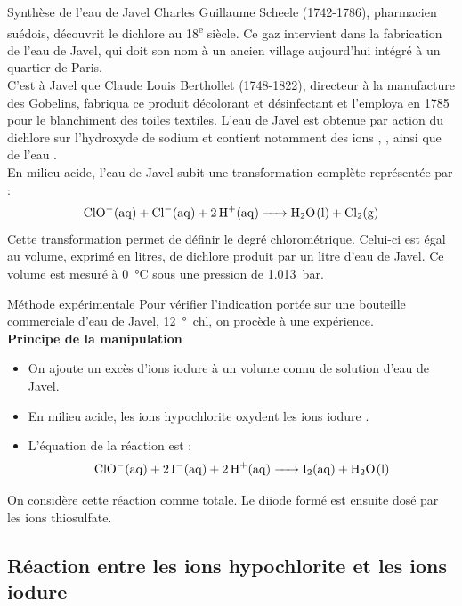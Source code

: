 \documentclass[a4paper,fontsize=11pt,fleqn]{scrartcl}
\begin{document}
\begin{documentboxenv}{Synthèse de l'eau de Javel}
Charles Guillaume Scheele (1742-1786), pharmacien suédois, découvrit le dichlore au 18\textsuperscript{e} siècle. Ce gaz intervient dans la fabrication de l'eau de Javel, qui doit son nom à un ancien village aujourd'hui intégré à un quartier de Paris.\\
C'est à Javel que Claude Louis Berthollet (1748-1822), directeur à la manufacture des Gobelins, fabriqua ce produit décolorant et désinfectant et l'employa en 1785 pour le blanchiment des toiles textiles. L'eau de Javel est obtenue par action du dichlore  sur l'hydroxyde de sodium et contient notamment des ions , ,  ainsi que de l'eau .\\
En milieu acide, l'eau de Javel subit une transformation complète représentée par :
\[
\ce{ClO^-(aq) + Cl^-(aq) + 2H^+(aq) -> H2O(l) + Cl2(g)}
\]
Cette transformation permet de définir le degré chlorométrique. Celui-ci est égal au volume, exprimé en litres, de dichlore produit par un litre d'eau de Javel. Ce volume est mesuré à \SI{0}{\celsius} sous une pression de \SI{1.013}{\bar}.
\end{documentboxenv}

\begin{documentboxenv}{Méthode expérimentale}
Pour vérifier l'indication portée sur une bouteille commerciale d'eau de Javel, \SI{12}{\degree chl}, on procède à une expérience.\\
\textbf{Principe de la manipulation}
\begin{itemize}
    \item On ajoute un excès d'ions iodure à un volume connu de solution d'eau de Javel.
    \item En milieu acide, les ions hypochlorite  oxydent les ions iodure .
    \item L'équation de la réaction est :
    \[
    \ce{ClO^-(aq) + 2I^-(aq) + 2H^+(aq) -> I2(aq) + H2O(l)}
    \]
\end{itemize}
On considère cette réaction comme totale. Le diiode formé est ensuite dosé par les ions thiosulfate.
\end{documentboxenv}

\subsection{Réaction entre les ions hypochlorite et les ions iodure}
\end{document}

